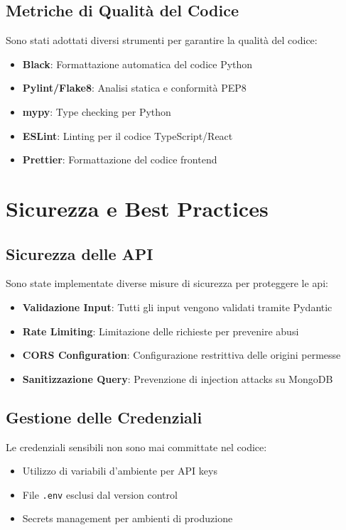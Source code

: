 \subsection{Metriche di Qualità del Codice}
Sono stati adottati diversi strumenti per garantire la qualità del codice:

\begin{itemize}
    \item \textbf{Black}: Formattazione automatica del codice Python
    \item \textbf{Pylint/Flake8}: Analisi statica e conformità PEP8
    \item \textbf{mypy}: Type checking per Python
    \item \textbf{ESLint}: Linting per il codice TypeScript/React
    \item \textbf{Prettier}: Formattazione del codice frontend
\end{itemize}

\section{Sicurezza e Best Practices}
\label{sec:security_practices}

\subsection{Sicurezza delle API}
Sono state implementate diverse misure di sicurezza per proteggere le \gls{api}:

\begin{itemize}
    \item \textbf{Validazione Input}: Tutti gli input vengono validati tramite Pydantic
    \item \textbf{Rate Limiting}: Limitazione delle richieste per prevenire abusi
    \item \textbf{CORS Configuration}: Configurazione restrittiva delle origini permesse
    \item \textbf{Sanitizzazione Query}: Prevenzione di injection attacks su MongoDB
\end{itemize}

\subsection{Gestione delle Credenziali}
Le credenziali sensibili non sono mai committate nel codice:
\begin{itemize}
    \item Utilizzo di variabili d'ambiente per API keys
    \item File \texttt{.env} esclusi dal version control
    \item Secrets management per ambienti di produzione
\end{itemize}

